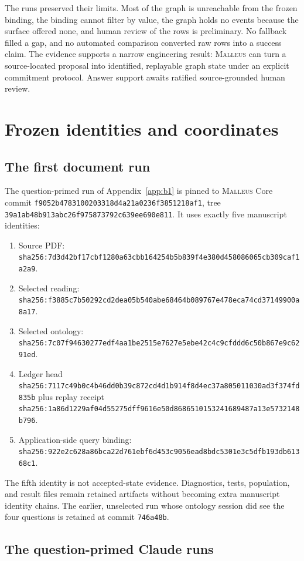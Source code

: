 \documentclass[10pt]{article}
\newcommand{\malleus}{\textsc{Malleus}}
\newcommand{\digest}[1]{{\scriptsize\nolinkurl{sha256:#1}}}
\newcommand{\gitid}[1]{{\scriptsize\nolinkurl{#1}}}
\begin{document}
The runs preserved their limits. Most of the graph is unreachable from the frozen binding, the binding cannot filter by value, the graph holds no events because the surface offered none, and human review of the rows is preliminary. No fallback filled a gap, and no automated comparison converted raw rows into a success claim. The evidence supports a narrow engineering result: \malleus{} can turn a source-located proposal into identified, replayable graph state under an explicit commitment protocol. Answer support awaits ratified source-grounded human review.

\appendix
\section{Frozen identities and coordinates}
\label{app:identities}

\subsection{The first document run}

The question-primed run of Appendix~\ref{app:b1} is pinned to \malleus{} Core commit \gitid{f9052b4783100203318d4a21a0236f3851218af1}, tree \gitid{39a1ab48b913abc26f975873792c639ee690e811}. It uses exactly five manuscript identities:
\begin{enumerate}
\item Source PDF: \digest{7d3d42bf17cbf1280a63cbb164254b5b839f4e380d458086065cb309caf1a2a9}.
\item Selected reading: \digest{f3885c7b50292cd2dea05b540abe68464b089767e478eca74cd37149900a8a17}.
\item Selected ontology: \digest{7c07f94630277edf4aa1be2515e7627e5ebe42c4c9cfddd6c50b867e9c6291ed}.
\item Ledger head \digest{7117c49b0c4b46dd0b39c872cd4d1b914f8d4ec37a805011030ad3f374fd835b} plus replay receipt \digest{1a86d1229af04d55275dff9616e50d8686510153241689487a13e5732148b796}.
\item Application-side query binding: \digest{922e2c628a86bca22d761ebf6d453c9056ead8bdc5301e3c5dfb193db61368c1}.
\end{enumerate}
The fifth identity is not accepted-state evidence. Diagnostics, tests, population, and result files remain retained artifacts without becoming extra manuscript identity chains. The earlier, unselected run whose ontology session did see the four questions is retained at commit \gitid{746a48b}.

\subsection{The question-primed Claude runs}
\end{document}

